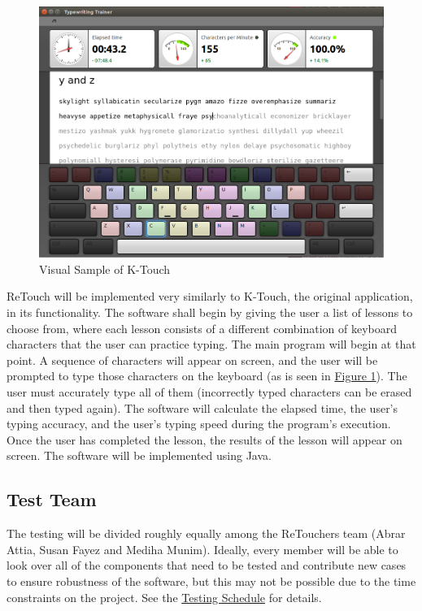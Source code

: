 \documentclass[12pt, titlepage]{article}
\begin{document}
\begin{figure}[h!]
	\includegraphics[scale=0.5]{KTouchLesson.png}
	\centering
	\caption{Visual Sample of K-Touch}
	\label{figure:1}
\end{figure}

	ReTouch will be implemented very similarly to K-Touch, the original application, in its functionality. The software shall begin by giving the user a list of lessons to choose from, where each lesson consists of a different combination of keyboard characters that the user can practice typing. The main program will begin at that point. A sequence of characters will appear on screen, and the user will be prompted to type those characters on the keyboard (as is seen in \hyperref[figure:1]{Figure 1}). The user must accurately type all of them (incorrectly typed characters can be erased and then typed again). The software will calculate the elapsed time, the user's typing accuracy, and the user's typing speed during the program's execution. Once the user has completed the lesson, the results of the lesson will appear on screen. The software will be implemented using Java.

\subsection{Test Team}

	The testing will be divided roughly equally among the ReTouchers team (Abrar Attia, Susan Fayez and Mediha Munim). Ideally, every member will be able to look over all of the components that need to be tested and contribute new cases to ensure robustness of the software, but this may not be possible due to the time constraints on the project. See the \hyperref[sec:ts]{Testing Schedule} for details.
\end{document}
